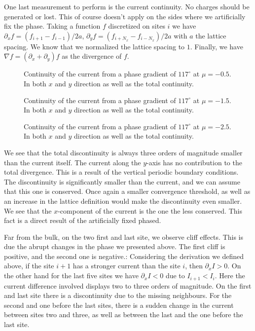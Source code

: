 \documentclass[..\main.tex]{subfile}
\begin{document}
One last measurement to perform is the current continuity. No charges should be generated or lost. This of course doesn't apply on
the sides where we artificially fix the phase. Taking a function $f$ discretized on sites $i$ we have $\partial_x f = (f_{i+1} - f_{i-1} )/2a$,
$\partial_y f = (f_{i+N_x} - f_{i-N_x} )/2a$ with
$a$ the lattice spacing. We know that we normalized the lattice spacing to $1$. Finally, we have $\nabla f = (\partial_x + \partial_y) f$ as the divergence
of $f$.
\begin{figure}[H]
    \centering
    
    \caption{Continuity of the current from a phase gradient of $117^{\circ}$ at $\mu = -0.5$. In both $x$ and $y$ direction as
    well as the total continuity.}
\end{figure}
\begin{figure}[H]
    \centering
    
    \caption{Continuity of the current from a phase gradient of $117^{\circ}$ at $\mu = -1.5$. In both $x$ and $y$ direction as
    well as the total continuity.}
\end{figure}
\begin{figure}[H]
    \centering
    
    \caption{Continuity of the current from a phase gradient of $117^{\circ}$ at $\mu = -2.5$. In both $x$ and $y$ direction as
    well as the total continuity.}
\end{figure}
We see that the total discontinuity is always three orders of magnitude smaller than the current itself. 
The current along the $y$-axis has no contribution to the total divergence. This is a result of the vertical periodic boundary conditions.
The discontinuity is
significantly smaller than the current, and we can assume that this one is conserved. Once again a smaller convergence threshold,
as well as an increase in the lattice definition would make the discontinuity even smaller.
We see that the $x$-component of the current is the one the less conserved. This fact is a direct result of the artificially fixed phased.

Far from the bulk, on the two first and last site, we observe cliff effects. This is due the abrupt changes in the phase we presented above.
The first cliff is positive, and the second one is negative.:
Considering the derivation we defined above, if the site $i+1$ has a stronger current than the site $i$, then $\partial_x I > 0$.
On the other hand for the last five sites we have $\partial_x I <0$ due to $I_{i+1}< I_i$. Here the current difference involved displays two to three orders of magnitude.
On the first and last site there is a discontinuity due to the missing neighbours. For the second and one before the last sites, there is a sudden change in the current
between sites two and three, as well as between the last and the one before the last site.\\
\end{document}

